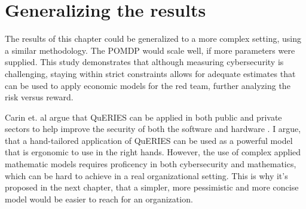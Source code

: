 \section{Generalizing the results}

The results of this chapter could be generalized to a more complex
setting, using a similar methodology. The POMDP would scale well, if
more parameters were supplied. This study demonstrates that although
measuring cybersecurity is challenging, staying within strict
constraints allows for adequate estimates that can be used to apply
economic models for the red team, further analyzing the risk versus
reward.
 
Carin et. al argue that QuERIES can be
applied in both public and private sectors to help improve the
security of both the software and hardware \cite{carin2008cybersecurity}. I argue, that a hand-tailored
application of QuERIES can be used as a powerful model that is
ergonomic to use in the right hands. However, the use of complex
applied mathematic models requires proficency in both cybersecurity and
mathematics, which can be hard to achieve in a real organizational
setting. This is why it's proposed in the next chapter, that a simpler, more pessimistic and more concise model would be easier to reach for an
organization.
